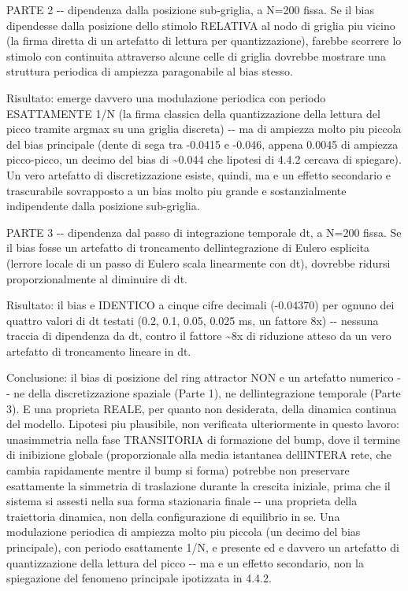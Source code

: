 \documentclass[
  italian,
]{article}
\begin{document}
PARTE 2 -\/- dipendenza dalla posizione sub-griglia, a N=200 fissa. Se il bias dipendesse dalla posizione dello stimolo RELATIVA al nodo di griglia piu\textquotesingle{} vicino (la firma diretta di un artefatto di lettura per quantizzazione), farebbe scorrere lo stimolo con continuita\textquotesingle{} attraverso alcune celle di griglia dovrebbe mostrare una struttura periodica di ampiezza paragonabile al bias stesso.

Risultato: emerge davvero una modulazione periodica con periodo ESATTAMENTE 1/N (la firma classica della quantizzazione della lettura del picco tramite argmax su una griglia discreta) -\/- ma di ampiezza molto piu\textquotesingle{} piccola del bias principale (dente di sega tra -0.0415 e -0.046, appena 0.0045 di ampiezza picco-picco, un decimo del bias di \textasciitilde0.044 che l\textquotesingle ipotesi di 4.4.2 cercava di spiegare). Un vero artefatto di discretizzazione esiste, quindi, ma e\textquotesingle{} un effetto secondario e trascurabile sovrapposto a un bias molto piu\textquotesingle{} grande e sostanzialmente indipendente dalla posizione sub-griglia.

PARTE 3 -\/- dipendenza dal passo di integrazione temporale dt, a N=200 fissa. Se il bias fosse un artefatto di troncamento dell\textquotesingle integrazione di Eulero esplicita (l\textquotesingle errore locale di un passo di Eulero scala linearmente con dt), dovrebbe ridursi proporzionalmente al diminuire di dt.

Risultato: il bias e\textquotesingle{} IDENTICO a cinque cifre decimali (-0.04370) per ognuno dei quattro valori di dt testati (0.2, 0.1, 0.05, 0.025 ms, un fattore 8x) -\/- nessuna traccia di dipendenza da dt, contro il fattore \textasciitilde8x di riduzione atteso da un vero artefatto di troncamento lineare in dt.

Conclusione: il bias di posizione del ring attractor NON e\textquotesingle{} un artefatto numerico -\/- ne\textquotesingle{} della discretizzazione spaziale (Parte 1), ne\textquotesingle{} dell\textquotesingle integrazione temporale (Parte 3). E\textquotesingle{} una proprieta\textquotesingle{} REALE, per quanto non desiderata, della dinamica continua del modello. L\textquotesingle ipotesi piu\textquotesingle{} plausibile, non verificata ulteriormente in questo lavoro: un\textquotesingle asimmetria nella fase TRANSITORIA di formazione del bump, dove il termine di inibizione globale (proporzionale alla media istantanea dell\textquotesingle INTERA rete, che cambia rapidamente mentre il bump si forma) potrebbe non preservare esattamente la simmetria di traslazione durante la crescita iniziale, prima che il sistema si assesti nella sua forma stazionaria finale -\/- una proprieta\textquotesingle{} della traiettoria dinamica, non della configurazione di equilibrio in se\textquotesingle. Una modulazione periodica di ampiezza molto piu\textquotesingle{} piccola (un decimo del bias principale), con periodo esattamente 1/N, e\textquotesingle{} presente ed e\textquotesingle{} davvero un artefatto di quantizzazione della lettura del picco -\/- ma e\textquotesingle{} un effetto secondario, non la spiegazione del fenomeno principale ipotizzata in 4.4.2.
\end{document}
